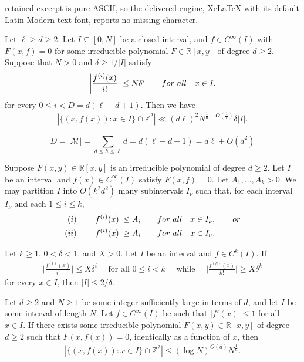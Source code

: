 \documentclass[10pt,a4paper]{amsart}
\newcommand{\R}{{\mathbb R}}
\newcommand{\Z}{{\mathbb Z}}
\begin{document}
retained excerpt is pure ASCII, so the delivered engine, XeLaTeX with its default Latin Modern text font, reports no missing character.
\begin{lemma}\label{lem-intbound1}
Let $\ell \geq d\geq 2$. Let $I\subseteq [0,N]$ be a closed interval, and $f\in C^{\infty}(I)$ with $F(x,f)=0$ for some irreducible polynomial $F\in \R[x,y]$ of degree $d\geq 2$. Suppose that $N>0$ and $\delta\geq 1/\lvert I\rvert$ satisfy
\[\left\lvert \frac{f^{(i)}(x)}{i!}\right\rvert\leq N\delta^i\qquad {\rm for \ all }\quad x\in I,\]
for every $0\leq i<D=d(\ell-d+1)$. Then we have
\begin{align*}
\left\lvert\big\{(x,f(x)) : x\in I\big\}\cap \Z^2\right\rvert \ll(d\ell)^2 N^{\frac{1}{d}+O(\frac{1}{\ell})} \delta\lvert I\rvert.
\end{align*}
\end{lemma}

\begin{equation}
D =\lvert \mathcal{M}\rvert = \sum_{d\le h\le \ell} d  =d(\ell-d+1) = d\ell+O(d^2) \label{eq:Dcompute}
\end{equation}

\begin{lemma}\label{lem:6}
Suppose $F(x,y)\in\R[x,y]$ is an irreducible polynomial of degree $d\ge2$. Let $I$ be an interval and $f(x)\in C^\infty(I)$ satisfy $F(x,f)=0$. Let $A_1,\ldots,A_k>0$. We may partition $I$ into $O(k^2d^2)$ many subintervals $I_\nu$ such that, for each interval $I_\nu$ and each $1\leq i\leq k$,
\begin{align*}
{\rm (i)}&\qquad |f^{(i)}(x)| \le A_i \qquad {\rm for \ all }\quad x\in I_\nu, \qquad {\rm or}\\
{\rm (ii)}&\qquad |f^{(i)}(x)| \ge A_i \qquad {\rm for \ all }\quad x\in I_\nu.
\end{align*}
\end{lemma}

\begin{lemma}\label{lem:7}
Let $k\geq 1$, $0<\delta<1$, and $X>0$. Let $I$ be an interval and $f\in C^k(I)$. If
\begin{align*}
\Big|\frac{f^{(i)}(x)}{i!}\Big| \le X\delta^i
\quad\textrm{ for all }0\leq i<k
\quad\textrm{ while }\quad\Big|\frac{f^{(k)}(x)}{k!}\Big| \ge X\delta^k
\end{align*}
for every $x\in I$, then $\lvert I\rvert \leq 2/\delta$.
\end{lemma}

\begin{theorem}\label{thm:GNbound}
Let $d\geq 2$ and $N\geq 1$ be some integer sufficiently large in terms of $d$, and let $I$ be some interval of length $N$. Let $f\in C^\infty(I)$ be such that $\lvert f'(x)\rvert \leq 1$ for all $x\in I$. If there exists some irreducible polynomial $F(x,y)\in \R[x,y]$ of degree $d\geq 2$ such that $F(x,f(x))= 0$, identically as a function of $x$, then 
\begin{align*}
\left\lvert\big\{ (x,f(x)) : x\in I\big\}\cap \Z^2\right\rvert \le (\log N)^{O(d)}N^{\frac{1}{d}}.
\end{align*}
\end{theorem}
\end{document}
